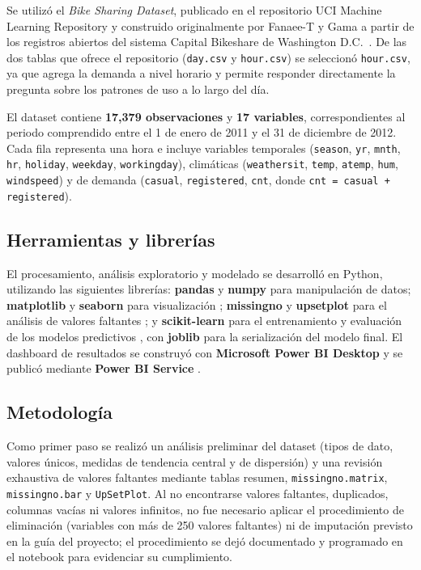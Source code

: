 \documentclass[conference]{IEEEtran}
\begin{document}
Se utilizó el \textit{Bike Sharing Dataset}, publicado en el repositorio UCI Machine Learning Repository y construido originalmente por Fanaee-T y Gama a partir de los registros abiertos del sistema Capital Bikeshare de Washington D.C.\ \cite{fanaee2014}. De las dos tablas que ofrece el repositorio (\texttt{day.csv} y \texttt{hour.csv}) se seleccionó \texttt{hour.csv}, ya que agrega la demanda a nivel horario y permite responder directamente la pregunta sobre los patrones de uso a lo largo del día.

El dataset contiene \textbf{17{,}379 observaciones} y \textbf{17 variables}, correspondientes al periodo comprendido entre el 1 de enero de 2011 y el 31 de diciembre de 2012. Cada fila representa una hora e incluye variables temporales (\texttt{season}, \texttt{yr}, \texttt{mnth}, \texttt{hr}, \texttt{holiday}, \texttt{weekday}, \texttt{workingday}), climáticas (\texttt{weathersit}, \texttt{temp}, \texttt{atemp}, \texttt{hum}, \texttt{windspeed}) y de demanda (\texttt{casual}, \texttt{registered}, \texttt{cnt}, donde \texttt{cnt = casual + registered}).

\subsection{Herramientas y librerías}

El procesamiento, análisis exploratorio y modelado se desarrolló en Python, utilizando las siguientes librerías: \textbf{pandas} y \textbf{numpy} para manipulación de datos; \textbf{matplotlib} y \textbf{seaborn} para visualización \cite{hunter2007,waskom2021}; \textbf{missingno} y \textbf{upsetplot} para el análisis de valores faltantes \cite{bilogur2018,lex2014}; y \textbf{scikit-learn} para el entrenamiento y evaluación de los modelos predictivos \cite{pedregosa2011}, con \textbf{joblib} para la serialización del modelo final. El dashboard de resultados se construyó con \textbf{Microsoft Power BI Desktop} y se publicó mediante \textbf{Power BI Service} \cite{powerbi2026}.

\subsection{Metodología}

Como primer paso se realizó un análisis preliminar del dataset (tipos de dato, valores únicos, medidas de tendencia central y de dispersión) y una revisión exhaustiva de valores faltantes mediante tablas resumen, \texttt{missingno.matrix}, \texttt{missingno.bar} y \texttt{UpSetPlot}. Al no encontrarse valores faltantes, duplicados, columnas vacías ni valores infinitos, no fue necesario aplicar el procedimiento de eliminación (variables con más de 250 valores faltantes) ni de imputación previsto en la guía del proyecto; el procedimiento se dejó documentado y programado en el notebook para evidenciar su cumplimiento.
\end{document}

